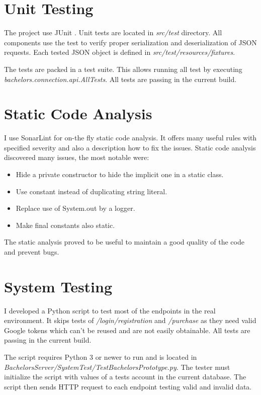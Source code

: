 \section{Unit Testing}
The project use JUnit \cite{junit}. Unit tests are located in \textit{src/test} directory. All components use the test to verify proper serialization and deserialization of JSON requests. Each tested JSON object is defined in \textit{src/test/resources/fixtures}.

The tests are packed in a test suite. This allows running all test by executing \textit{bachelors.connection.api.AllTests}. All tests are passing in the current build.

\section{Static Code Analysis}
I use SonarLint \cite{sonarlint} for on-the fly static code analysis. It offers many useful rules with specified severity and also a description how to fix the issues. Static code analysis discovered many issues, the most notable were:
\begin{itemize}
	\item Hide a private constructor to hide the implicit one in a static class.
	\item Use constant instead of duplicating string literal.
	\item Replace use of System.out by a logger.
	\item Make final constants also static.
\end{itemize}
The static analysis proved to be useful to maintain a good quality of the code and prevent bugs.

\section{System Testing}
I developed a Python script to test most of the endpoints in the real environment. It skips tests of \textit{/login/registration} and \textit{/purchase} as they need valid Google tokens which can't be reused and are not easily obtainable. All tests are passing in the current build.

The script requires Python 3 or newer to run and is located in \textit{BachelorsServer/SystemTest/TestBachelorsPrototype.py}. The tester must initialize the script with values of a tests account in the current database. The script then sends HTTP request to each endpoint testing valid and invalid data.

